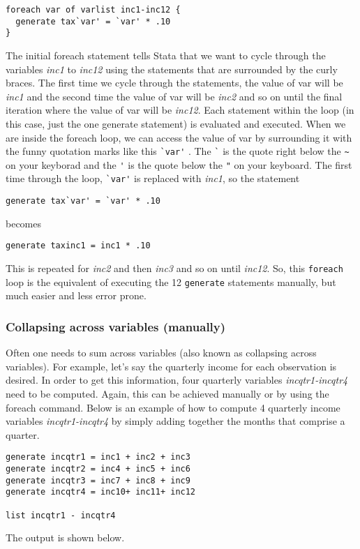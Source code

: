 \begin{lstlisting}
foreach var of varlist inc1-inc12 {
  generate tax`var' = `var' * .10
}
\end{lstlisting}

The initial foreach statement tells Stata that we want to cycle through the variables \textit{inc1} to \textit{inc12} using the statements that are surrounded by the curly braces.  The first time we cycle through the statements, the value of var will be \textit{inc1}  and the second time the value of var will  be \textit{inc2} and so on until the final iteration where the value of var will be \textit{inc12}.  Each statement within the loop (in this case, just the one generate statement) is evaluated and executed. When we are inside the foreach loop, we can access the value of var by surrounding it with the funny quotation marks like this \lstinline{`var'} . The \lstinline{`} is the quote right below the \lstinline{~} on your keyborad and the \lstinline{'} is the quote below the \lstinline{"} on your keyboard. The first time through the loop, \lstinline{`var'} is replaced with \textit{inc1}, so the statement

\begin{lstlisting}
generate tax`var' = `var' * .10
\end{lstlisting}
becomes
\begin{lstlisting}
generate taxinc1 = inc1 * .10
\end{lstlisting}

This is repeated for \textit{inc2} and then \textit{inc3} and so on until \textit{inc12}. So, this \lstinline{foreach} loop is the equivalent of executing the 12 \lstinline{generate} statements manually, but much easier and less error prone.

\subsubsection{Collapsing across variables (manually)}
Often one needs to sum across variables (also known as collapsing across variables).  For example, let's say the quarterly income for each observation is desired.  In order to get this information, four quarterly variables \textit{incqtr1-incqtr4} need to be computed. Again, this can be achieved manually or by using the foreach command. Below is an example of how to compute 4 quarterly income variables \textit{incqtr1-incqtr4} by simply adding together the months that comprise a quarter.

\begin{lstlisting}
generate incqtr1 = inc1 + inc2 + inc3
generate incqtr2 = inc4 + inc5 + inc6
generate incqtr3 = inc7 + inc8 + inc9
generate incqtr4 = inc10+ inc11+ inc12

list incqtr1 - incqtr4
\end{lstlisting}
The output is shown below.

